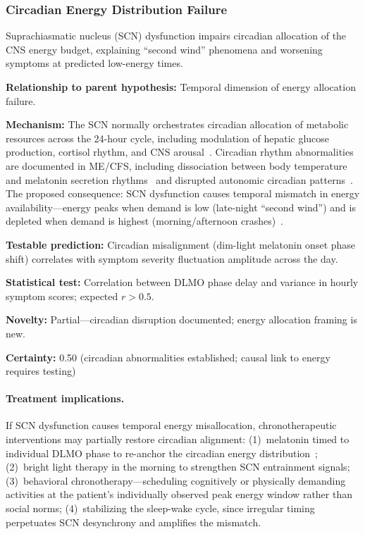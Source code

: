 \subsubsection{Circadian Energy Distribution Failure}

\begin{hypothesis}
\label{hyp:circadian-failure}
Suprachiasmatic nucleus (SCN) dysfunction impairs circadian allocation of the CNS energy budget, explaining ``second wind'' phenomena and worsening symptoms at predicted low-energy times.

\textbf{Relationship to parent hypothesis:} Temporal dimension of energy allocation failure.

\textbf{Mechanism:} The SCN normally orchestrates circadian allocation of metabolic resources across the 24-hour cycle, including modulation of hepatic glucose production, cortisol rhythm, and CNS arousal~\cite{van2012circadian}. Circadian rhythm abnormalities are documented in ME/CFS, including dissociation between body temperature and melatonin secretion rhythms~\cite{williams2001circadian} and disrupted autonomic circadian patterns~\cite{cambras2018circadian}. The proposed consequence: SCN dysfunction causes temporal mismatch in energy availability---energy peaks when demand is low (late-night ``second wind'') and is depleted when demand is highest (morning/afternoon crashes)~\cite{mccarthy2022circadian}.

\textbf{Testable prediction:} Circadian misalignment (dim-light melatonin onset phase shift) correlates with symptom severity fluctuation amplitude across the day.

\textbf{Statistical test:} Correlation between DLMO phase delay and variance in hourly symptom scores; expected $r > 0.5$.

\textbf{Novelty:} Partial---circadian disruption documented; energy allocation framing is new.

\textbf{Certainty:} 0.50 (circadian abnormalities established; causal link to energy requires testing)

\paragraph{Treatment implications.}
If SCN dysfunction causes temporal energy misallocation, chronotherapeutic interventions may partially restore circadian alignment: (1)~melatonin timed to individual DLMO phase to re-anchor the circadian energy distribution~\cite{castromarrero2021melatonin}; (2)~bright light therapy in the morning to strengthen SCN entrainment signals; (3)~behavioral chronotherapy---scheduling cognitively or physically demanding activities at the patient's individually observed peak energy window rather than social norms; (4)~stabilizing the sleep-wake cycle, since irregular timing perpetuates SCN desynchrony and amplifies the mismatch.


\end{hypothesis}
